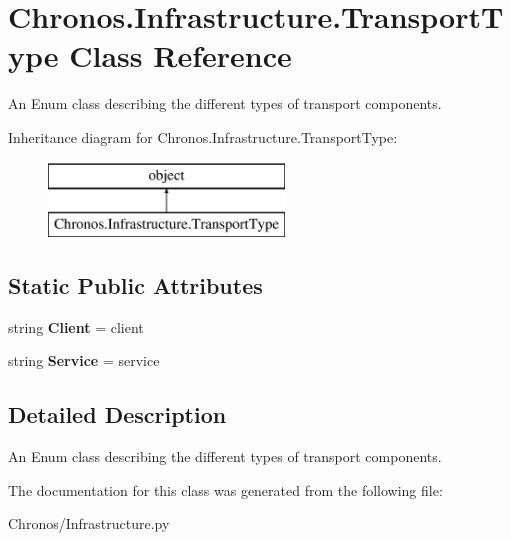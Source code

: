 \hypertarget{classChronos_1_1Infrastructure_1_1TransportType}{}\section{Chronos.\+Infrastructure.\+Transport\+Type Class Reference}
\label{classChronos_1_1Infrastructure_1_1TransportType}


An Enum class describing the different types of transport components.  


Inheritance diagram for Chronos.\+Infrastructure.\+Transport\+Type\+:\begin{figure}[H]
\begin{center}
\leavevmode
\includegraphics[height=2.000000cm]{classChronos_1_1Infrastructure_1_1TransportType}
\end{center}
\end{figure}
\subsection*{Static Public Attributes}
\begin{DoxyCompactItemize}
\item 
string {\bfseries Client} = \textquotesingle{}client\textquotesingle{}
\item 
string {\bfseries Service} = \textquotesingle{}service\textquotesingle{}
\end{DoxyCompactItemize}


\subsection{Detailed Description}
An Enum class describing the different types of transport components. 

The documentation for this class was generated from the following file\+:\begin{DoxyCompactItemize}
\item 
Chronos/Infrastructure.\+py\end{DoxyCompactItemize}
